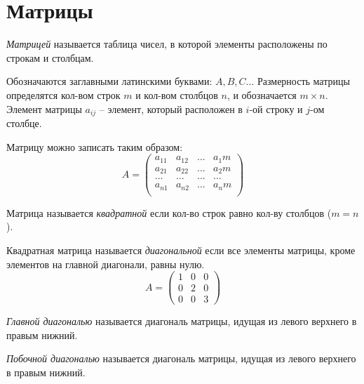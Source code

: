 \section{Матрицы}

\begin{definition}
  \textit{Матрицей} называется таблица чисел, в которой элементы расположены по строкам и столбцам.
\end{definition}

Обозначаются заглавными латинскими буквами: $A, B, C \ldots$
Размерность матрицы определятся кол-вом строк $m$ и кол-вом столбцов  $n$, и обозначается $m \times n$.
Элемент матрицы $a_{ij}$ -- элемент, который расположен в $i$-ой строку и  $j$-ом столбце.

Матрицу можно записать таким образом:  \[
A = 
\begin{pmatrix}
  a_{11} & a_{12} & \ldots & a_1m \\ 
  a_{21} & a_{22} & \ldots & a_2m \\ 
  \ldots & \ldots & \ldots & \ldots \\
  a_{n1} & a_{n2} & \ldots & a_nm \\ 
\end{pmatrix}
\]

\begin{definition}
  Матрица называется \textit{квадратной} если кол-во строк равно кол-ву столбцов ($m = n$).
\end{definition}

\begin{definition}
  Квадратная матрица называется \textit{диагональной} если все элементы матрицы, кроме элементов на главной диагонали, равны нулю. \[
  A = \begin{pmatrix}
    1 & 0 & 0 \\
    0 & 2 & 0 \\
    0 & 0 & 3
  \end{pmatrix}
  \] 
\end{definition}

\begin{definition}
  \textit{Главной диагональю} называется диагональ матрицы, идущая из левого верхнего в правым нижний.
\end{definition}

\begin{definition}
  \textit{Побочной диагональю} называется диагональ матрицы, идущая из левого верхнего в правым нижний.
\end{definition}

